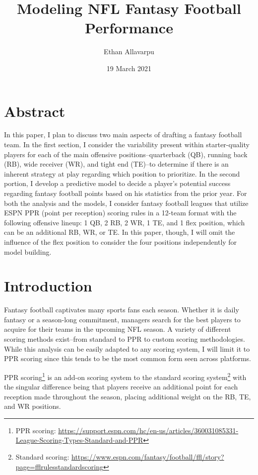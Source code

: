 \documentclass[
]{article}
\title{Modeling NFL Fantasy Football Performance}
\author{Ethan Allavarpu}
\date{19 March 2021}
\begin{document}
\maketitle

{
\setcounter{tocdepth}{1}
\tableofcontents
}
\vfill

\hypertarget{abstract}{%
\section{Abstract}\label{abstract}}

In this paper, I plan to discuss two main aspects of drafting a fantasy
football team. In the first section, I consider the variability present
within starter-quality players for each of the main offensive
positions--quarterback (QB), running back (RB), wide receiver (WR), and
tight end (TE)--to determine if there is an inherent strategy at play
regarding which position to prioritize. In the second portion, I develop
a predictive model to decide a player's potential success regarding
fantasy football points based on his statistics from the prior year. For
both the analysis and the models, I consider fantasy football leagues
that utilize ESPN PPR (point per reception) scoring rules in a 12-team
format with the following offensive lineup: 1 QB, 2 RB, 2 WR, 1 TE, and
1 flex position, which can be an additional RB, WR, or TE. In this
paper, though, I will omit the influence of the flex position to
consider the four positions independently for model building.

\newpage

\hypertarget{introduction}{%
\section{Introduction}\label{introduction}}

Fantasy football captivates many sports fans each season. Whether it is
daily fantasy or a season-long commitment, managers search for the best
players to acquire for their teams in the upcoming NFL season. A variety
of different scoring methods exist--from standard to PPR to custom
scoring methodologies. While this analysis can be easily adapted to any
scoring system, I will limit it to PPR scoring since this tends to be
the most common form seen across platforms.

PPR scoring\footnote{PPR scoring:
  \url{https://support.espn.com/hc/en-us/articles/360031085331-League-Scoring-Types-Standard-and-PPR}}
is an add-on scoring system to the standard scoring system\footnote{Standard
  scoring:
  \url{https://www.espn.com/fantasy/football/ffl/story?page=fflrulesstandardscoring}}
with the singular difference being that players receive an additional
point for each reception made throughout the season, placing additional
weight on the RB, TE, and WR positions.
\end{document}
